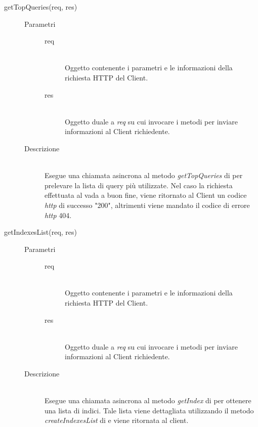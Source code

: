 \begin{description}
\begin{description}
 \item[getTopQueries(req, res)] \hfill 
   \begin{description}
   \item[Parametri] \hfill
    \begin{description}
     \item[req] \hfill \\
     Oggetto contenente i parametri e le informazioni della richiesta HTTP del Client.
     \item[res] \hfill \\
     Oggetto duale a \textit{req} su cui invocare i metodi per inviare informazioni al Client richiedente.
    \end{description}
   \item[Descrizione] \hfill \\
   Esegue una chiamata asincrona al metodo \textit{getTopQueries} di  per prelevare la lista di query più utilizzate. Nel caso la richiesta effettuata al  vada a buon fine, viene ritornato al Client un codice \textit{http} di successo "200", altrimenti viene mandato il codice di errore \textit{http} 404.
   \end{description}
   
    \item[getIndexesList(req, res)] \hfill 
      \begin{description}
      \item[Parametri] \hfill
       \begin{description}
        \item[req] \hfill \\
        Oggetto contenente i parametri e le informazioni della richiesta HTTP del Client.
        \item[res] \hfill \\
        Oggetto duale a \textit{req} su cui invocare i metodi per inviare informazioni al Client richiedente.
       \end{description}
      \item[Descrizione] \hfill \\
      Esegue una chiamata asincrona al metodo \textit{getIndex} di  per ottenere una lista di indici. Tale lista viene dettagliata utilizzando il metodo \textit{createIndexesList} di  e viene ritornata al client.
      \end{description}
      

\end{description}
\end{description}
